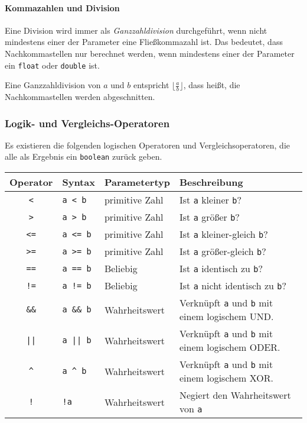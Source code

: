 		\paragraph{Kommazahlen und Division}
			Eine Division wird immer als \textit{Ganzzahldivision} durchgeführt, wenn nicht mindestens einer der Parameter eine Fließkommazahl ist. Das bedeutet, dass Nachkommastellen nur berechnet werden, wenn mindestens einer der Parameter ein \lstinline|float| oder \lstinline|double| ist.
			
			Eine Ganzzahldivision von \(a\) und \(b\) entspricht \( \big\lfloor \frac{a}{b} \big\rfloor \), dass heißt, die Nachkommastellen werden abgeschnitten.
	
	\subsubsection{Logik- und Vergleichs-Operatoren}
		Es existieren die folgenden logischen Operatoren und Vergleichsoperatoren, die alle als Ergebnis ein \lstinline|boolean| zurück geben.
		\begin{table}[H]
			\centering
			\begin{tabular}{c | l | l | l}
				\textbf{Operator} & \textbf{Syntax}   & \textbf{Parametertyp} & \textbf{Beschreibung}                                         \\ \hline
				   \texttt{<}     & \texttt{a < b}    & primitive Zahl        & Ist \texttt{a} kleiner \texttt{b}?                            \\
				   \texttt{>}     & \texttt{a > b}    & primitive Zahl        & Ist \texttt{a} größer \texttt{b}?                             \\
				   \texttt{<=}    & \texttt{a <= b}   & primitive Zahl        & Ist \texttt{a} kleiner-gleich \texttt{b}?                     \\
				   \texttt{>=}    & \texttt{a >= b}   & primitive Zahl        & Ist \texttt{a} größer-gleich \texttt{b}?                      \\
				   \texttt{==}    & \texttt{a == b}   & Beliebig              & Ist \texttt{a} identisch zu \texttt{b}?                       \\
				   \texttt{!=}    & \texttt{a != b}   & Beliebig              & Ist \texttt{a} nicht identisch zu \texttt{b}?                 \\
				  \texttt{\&\&}   & \texttt{a \&\& b} & Wahrheitswert         & Verknüpft \texttt{a} und \texttt{b} mit einem logischem UND.  \\
				   \texttt{||}    & \texttt{a || b}   & Wahrheitswert         & Verknüpft \texttt{a} und \texttt{b} mit einem logischem ODER. \\
				   \texttt{\^}    & \texttt{a \^{} b} & Wahrheitswert         & Verknüpft \texttt{a} und \texttt{b} mit einem logischem XOR.  \\
				   \texttt{!}     & \texttt{!a}       & Wahrheitswert         & Negiert den Wahrheitswert von \texttt{a}
			\end{tabular}
		\end{table}
